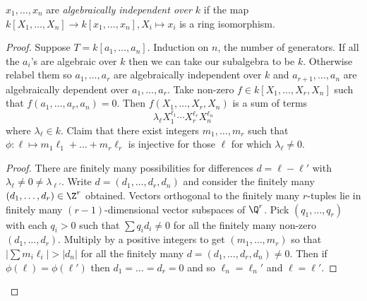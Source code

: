 \documentclass[a4paper]{article}
\begin{document}
\begin{definition}
  \(x_1, \dots, x_n\) are \emph{algebraically independent over \(k\)} if the map \(k[X_1, \dots, X_n] \to k[x_1, \dots, x_n], X_i \mapsto x_i\) is a ring isomorphism.
\end{definition}

\begin{proof}
  Suppose \(T = k[a_1, \dots, a_n]\). Induction on \(n\), the number of generators. If all the \(a_i\)'s are algebraic over \(k\) then we can take our subalgebra to be \(k\). Otherwise relabel them so \(a_1, \dots, a_r\) are algebraically independent over \(k\) and \(a_{r + 1}, \dots, a_n\) are algebraically dependent over \(a_1, \dots, a_r\). Take non-zero \(f \in k[X_1, \dots, X_r, X_n]\) such that \(f(a_1, \dots, a_r, a_n) = 0\). Then \(f(X_1, \dots, X_r, X_n)\) is a sum of terms
  \[
    \lambda_\ell X_1^{\ell_1} \cdots X_r^{\ell_r} X_n^{\ell_n}
  \]
  where \(\lambda_\ell \in k\). Claim that there exist integers \(m_1, \dots, m_r\) such that \(\phi: \ell \mapsto m_1 \ell_1 + \dots + m_r \ell_r\) is injective for those \(\ell\) for which \(\lambda_\ell \neq 0\).

  \begin{proof}
    There are finitely many possibilities for differences \(d = \ell - \ell'\) with \(\lambda_\ell \neq 0 \neq \lambda_{\ell'}\). Write \(d = (d_1, \dots, d_r, d_n)\) and consider the finitely many \((d_1, \dots, d_r) \in \Z^r\) obtained. Vectors orthogonal to the finitely many \(r\)-tuples lie in finitely many \((r - 1)\)-dimensional vector subspaces of \(\Q^r\). Pick \((q_1, \dots, q_r)\) with each \(q_i > 0\) such that \(\sum q_id_i \neq 0\) for all the finitely many non-zero \((d_1, \dots, d_r)\). Multiply by a positive integers to get \((m_1, \dots, m_r)\) so that \(|\sum m_i \ell_i| > |d_n|\) for all the finitely many \(d = (d_1, \dots, d_r, d_n) \neq 0\). Then if \(\phi(\ell) = \phi(\ell')\) then \(d_1 = \dots = d_r = 0\) and so \(\ell_n = \ell_n'\) and \(\ell = \ell'\).
  \end{proof}


\end{proof}
\end{document}
